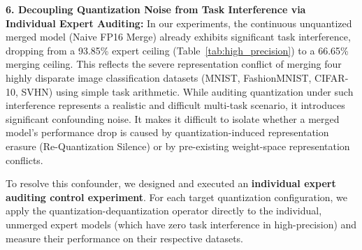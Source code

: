 \begin{table}[t]
\centering
\caption{\textbf{Control Experiment: Individual Unmerged Quantized Experts.} We apply each target quantization configuration directly to the task-specific, unmerged experts (which have zero task interference in high-precision, i.e., $100\%$ task alignment). This isolates and measures the drop from discretization noise alone. To ensure direct comparability and eliminate seed-based sub-sampling fluctuations, the high-precision unmerged FP16 baseline is unified with Table~\ref{tab:high_precision} ($93.85\%$).}
\label{tab:unmerged_quantized}
\vskip 0.1in
\end{table}

\textbf{6. Decoupling Quantization Noise from Task Interference via Individual Expert Auditing:}
In our experiments, the continuous unquantized merged model (Naive FP16 Merge) already exhibits significant task interference, dropping from a 93.85\% expert ceiling (Table~\ref{tab:high_precision}) to a 66.65\% merging ceiling. This reflects the severe representation conflict of merging four highly disparate image classification datasets (MNIST, FashionMNIST, CIFAR-10, SVHN) using simple task arithmetic. 
While auditing quantization under such interference represents a realistic and difficult multi-task scenario, it introduces significant confounding noise. It makes it difficult to isolate whether a merged model's performance drop is caused by quantization-induced representation erasure (Re-Quantization Silence) or by pre-existing weight-space representation conflicts.

To resolve this confounder, we designed and executed an \textbf{individual expert auditing control experiment}. For each target quantization configuration, we apply the quantization-dequantization operator directly to the individual, unmerged expert models (which have zero task interference in high-precision) and measure their performance on their respective datasets.

